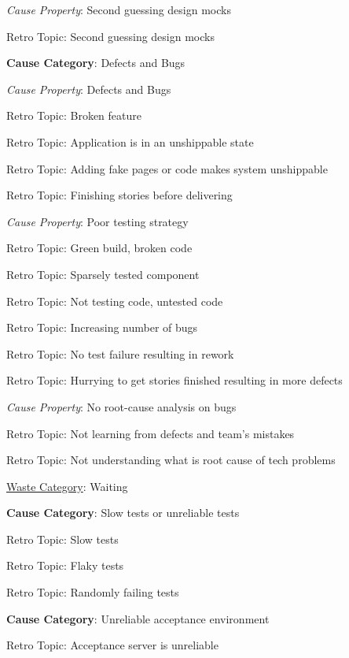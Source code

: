 \quad \quad \textit{Cause Property}: Second guessing design mocks

\quad \quad \quad Retro Topic: Second guessing design mocks

\quad \textbf{Cause Category}: Defects and Bugs

\quad \quad \textit{Cause Property}: Defects and Bugs

\quad \quad \quad Retro Topic: Broken feature

\quad \quad \quad Retro Topic: Application is in an unshippable state

\quad \quad \quad Retro Topic: Adding fake pages or code makes system unshippable

\quad \quad \quad Retro Topic: Finishing stories before delivering

\quad \quad \textit{Cause Property}: Poor testing strategy

\quad \quad \quad Retro Topic: Green build, broken code

\quad \quad \quad Retro Topic: Sparsely tested component

\quad \quad \quad Retro Topic: Not testing code, untested code

\quad \quad \quad Retro Topic: Increasing number of bugs

\quad \quad \quad Retro Topic: No test failure resulting in rework

\quad \quad \quad Retro Topic: Hurrying to get stories finished resulting in more defects

\quad \quad \textit{Cause Property}: No root-cause analysis on bugs

\quad \quad \quad Retro Topic: Not learning from defects and team's mistakes

\quad \quad \quad Retro Topic: Not understanding what is root cause of tech problems








\underline{Waste Category}: Waiting

\quad \textbf{Cause Category}: Slow tests or unreliable tests

\quad \quad Retro Topic: Slow tests

\quad \quad Retro Topic: Flaky tests

\quad \quad Retro Topic: Randomly failing tests

\quad \textbf{Cause Category}: Unreliable acceptance environment

\quad \quad Retro Topic: Acceptance server is unreliable

